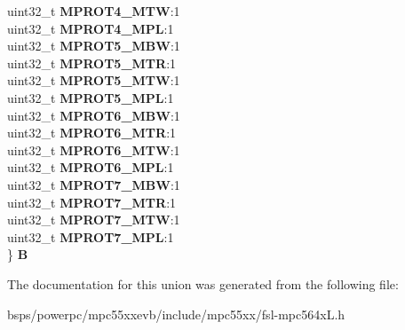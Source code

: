 \begin{DoxyCompactItemize}
\begin{tabbing}
\>uint32\_t {\bfseries MPROT4\_MTW}:1\\
\>uint32\_t {\bfseries MPROT4\_MPL}:1\\
\>uint32\_t {\bfseries MPROT5\_MBW}:1\\
\>uint32\_t {\bfseries MPROT5\_MTR}:1\\
\>uint32\_t {\bfseries MPROT5\_MTW}:1\\
\>uint32\_t {\bfseries MPROT5\_MPL}:1\\
\>uint32\_t {\bfseries MPROT6\_MBW}:1\\
\>uint32\_t {\bfseries MPROT6\_MTR}:1\\
\>uint32\_t {\bfseries MPROT6\_MTW}:1\\
\>uint32\_t {\bfseries MPROT6\_MPL}:1\\
\>uint32\_t {\bfseries MPROT7\_MBW}:1\\
\>uint32\_t {\bfseries MPROT7\_MTR}:1\\
\>uint32\_t {\bfseries MPROT7\_MTW}:1\\
\>uint32\_t {\bfseries MPROT7\_MPL}:1\\
\} {\bfseries B}\\

\end{tabbing}\end{DoxyCompactItemize}


The documentation for this union was generated from the following file\+:\begin{DoxyCompactItemize}
\item 
bsps/powerpc/mpc55xxevb/include/mpc55xx/fsl-\/mpc564x\+L.\+h\end{DoxyCompactItemize}
